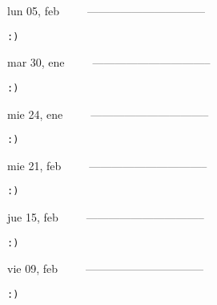 \documentclass[letterpaper,10pt]{article}
\begin{document}
\begin{multicols}{3}
{lun 05, feb\ \ \ \ \ --------------------------------}
\begin{flushright}\begin{small}\texttt{:)}\end{small}\end{flushright}
\vfill
{mar 30, ene\ \ \ \ \ --------------------------------}
\begin{flushright}\begin{small}\texttt{:)}\end{small}\end{flushright}\par
\vfill
{mie 24, ene\ \ \ \ \ --------------------------------}
\begin{flushright}\begin{small}\texttt{:)}\end{small}\end{flushright}\par
\vfill
\end{multicols}
\vspace{1.05cm}

\begin{multicols}{3}
{mie 21, feb\ \ \ \ \ --------------------------------}
\begin{flushright}\begin{small}\texttt{:)}\end{small}\end{flushright}
\vfill
{jue 15, feb\ \ \ \ \ --------------------------------}
\begin{flushright}\begin{small}\texttt{:)}\end{small}\end{flushright}\par
\vfill
{vie 09, feb\ \ \ \ \ --------------------------------}
\begin{flushright}\begin{small}\texttt{:)}\end{small}\end{flushright}\par
\vfill
\end{multicols}
\vspace{1.05cm}
\end{document}
